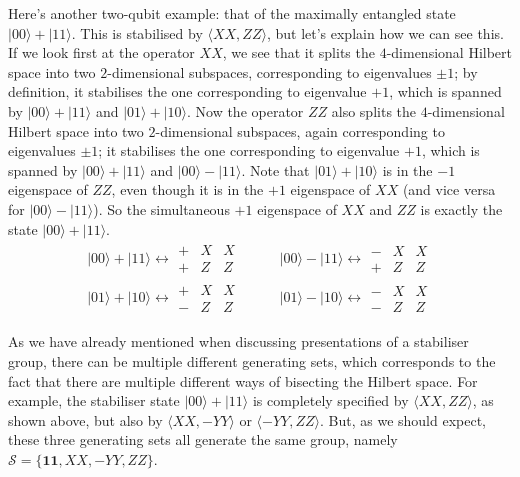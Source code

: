 \documentclass[fleqn,a4paper]{article}
\theoremstyle{definition}
\theoremstyle{definition}
\theoremstyle{definition}
\theoremstyle{definition}
\theoremstyle{remark}
\begin{document}
Here's another two-qubit example: that of the maximally entangled state \(|00\rangle+|11\rangle\).
This is stabilised by \(\langle XX,ZZ\rangle\), but let's explain how we can see this.
If we look first at the operator \(XX\), we see that it splits the \(4\)-dimensional Hilbert space into two \(2\)-dimensional subspaces, corresponding to eigenvalues \(\pm1\); by definition, it stabilises the one corresponding to eigenvalue \(+1\), which is spanned by \(|00\rangle+|11\rangle\) and \(|01\rangle+|10\rangle\).
Now the operator \(ZZ\) also splits the \(4\)-dimensional Hilbert space into two \(2\)-dimensional subspaces, again corresponding to eigenvalues \(\pm1\); it stabilises the one corresponding to eigenvalue \(+1\), which is spanned by \(|00\rangle+|11\rangle\) and \(|00\rangle-|11\rangle\).
Note that \(|01\rangle+|10\rangle\) is in the \(-1\) eigenspace of \(ZZ\), even though it is in the \(+1\) eigenspace of \(XX\) (and vice versa for \(|00\rangle-|11\rangle\)).
So the simultaneous \(+1\) eigenspace of \(XX\) and \(ZZ\) is exactly the state \(|00\rangle+|11\rangle\).
\[
  \begin{aligned}
    |00\rangle+|11\rangle
    \longleftrightarrow
    \begin{array}{c|cc|}
      +&X&X
    \\+&Z&Z
    \end{array}
    \quad&\quad
    |00\rangle-|11\rangle
    \longleftrightarrow
    \begin{array}{c|cc|}
      -&X&X
    \\+&Z&Z
    \end{array}
  \\|01\rangle+|10\rangle
    \longleftrightarrow
    \begin{array}{c|cc|}
      +&X&X
    \\-&Z&Z
    \end{array}
    \quad&\quad
    |01\rangle-|10\rangle
    \longleftrightarrow
    \begin{array}{c|cc|}
      -&X&X
    \\-&Z&Z
    \end{array}
  \end{aligned}
\]

As we have already mentioned when discussing presentations of a stabiliser group, there can be multiple different generating sets, which corresponds to the fact that there are multiple different ways of bisecting the Hilbert space.
For example, the stabiliser state \(|00\rangle+|11\rangle\) is completely specified by \(\langle XX,ZZ\rangle\), as shown above, but also by \(\langle XX,-YY\rangle\) or \(\langle -YY,ZZ\rangle\).
But, as we should expect, these three generating sets all generate the same group, namely \(\mathcal{S}=\{\mathbf{1}\mathbf{1},XX,-YY,ZZ\}\).
\end{document}
